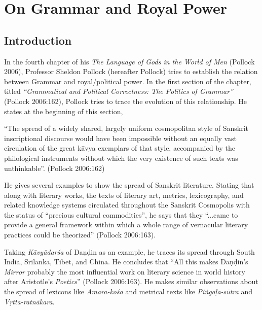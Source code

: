 \chapter{On Grammar and Royal Power}\label{chapter1}


\section*{Introduction}

In the fourth chapter of his {\sl The Language of Gods in the World of Men} (Pollock 2006), Professor Sheldon Pollock (hereafter Pollock) tries to establish the relation between Grammar and royal/political power.  In the first section of the chapter, titled {\sl ``Grammatical and Political Correctness: The Politics of Grammar''} (Pollock 2006:162), Pollock tries to trace the evolution of this relationship. He states at the beginning of this section, 
\begin{myquote}
``The spread of a widely shared, largely uniform cosmopolitan style of Sanskrit inscriptional discourse would have been impossible without an equally vast circulation of the great kāvya exemplars of that style, accompanied by the philological instruments without which the very existence of such texts was unthinkable''.
\hfill (Pollock 2006:162) 
\end{myquote}

He gives several examples to show the spread of Sanskrit literature. Stating that along with literary works, the texts of literary art, metrics, lexicography, and related knowledge systems circulated throughout the Sanskrit Cosmopolis with the status of ``precious cultural commodities'', he says that they ``...came to provide a general framework within which a whole range of vernacular literary practices could be theorized'' (Pollock 2006:163). 

Taking {\sl Kāvyādarśa} of Daṇḍin as an example, he traces its spread through South India, Srilanka, Tibet, and China. He concludes that ``All this makes Daṇḍin's {\sl Mirror} probably the most influential work on literary science in world history after Aristotle's {\sl Poetics}'' (Pollock 2006:163). He makes similar observations about the spread of lexicons like {\sl Amara-kośa} and metrical texts like {\sl Piṅgaḷa-sūtra} and {\sl Vṛtta-ratnākara}. 

